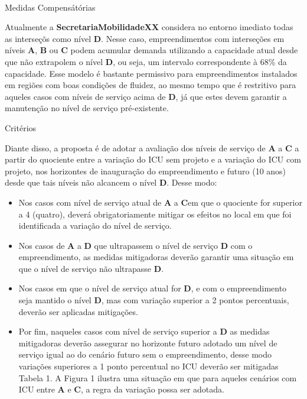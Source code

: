 \documentclass[]{article}
\providecommand{\tightlist}{%
  \setlength{\itemsep}{0pt}\setlength{\parskip}{0pt}}
\begin{document}
~

{ Medidas Compensátórias }

Atualmente a \textbf{SecretariaMobilidadeXX} considera no entorno
imediato todas as interseçõs como nível \textbf{D}. Nesse caso,
empreendimentos com interseções em níveis \textbf{A}, \textbf{B} ou
\textbf{C} podem acumular demanda utilizando a capacidade atual desde
que não extrapolem o nível \textbf{D}, ou seja, um intervalo
correspondente à 68\% da capacidade. Esse modelo é bastante permissivo
para empreendimentos instalados em regiões com boas condições de
fluidez, ao mesmo tempo que é restritivo para aqueles casos com níveis
de serviço acima de \textbf{D}, já que estes devem garantir a manutenção
no nível de serviço pré-existente.

{ Critérios}

Diante disso, a proposta é de adotar a avaliação dos níveis de serviço
de \textbf{A} a \textbf{C} a partir do quociente entre a variação do ICU
sem projeto e a variação do ICU com projeto, nos horizontes de
inauguração do empreendimento e futuro (10 anos) desde que tais níveis
não alcancem o nível \textbf{D}. Desse modo:

\begin{itemize}
\tightlist
\item
  Nos casos com nível de serviço atual de \textbf{A} a \textbf{C}em que
  o quociente for superior a 4 (quatro), deverá obrigatoriamente mitigar
  os efeitos no local em que foi identificada a variação do nível de
  serviço.\\
\item
  Nos casos de \textbf{A} a \textbf{D} que ultrapassem o nível de
  serviço \textbf{D} com o empreendimento, as medidas mitigadoras
  deverão garantir uma situação em que o nível de serviço não ultrapasse
  \textbf{D}.
\item
  Nos casos em que o nível de serviço atual for \textbf{D}, e com o
  empreendimento seja mantido o nível \textbf{D}, mas com variação
  superior a 2 pontos percentuais, deverão ser aplicadas mitigações.\\
\item
  Por fim, naqueles casos com nível de serviço superior a \textbf{D} as
  medidas mitigadoras deverão assegurar no horizonte futuro adotado um
  nível de serviço igual ao do cenário futuro sem o empreendimento,
  desse modo variações superiores a 1 ponto percentual no ICU deverão
  ser mitigadas Tabela 1. A Figura 1 ilustra uma situação em que para
  aqueles cenários com ICU entre \textbf{A} e \textbf{C}, a regra da
  variação possa ser adotada.
\end{itemize}
\end{document}
